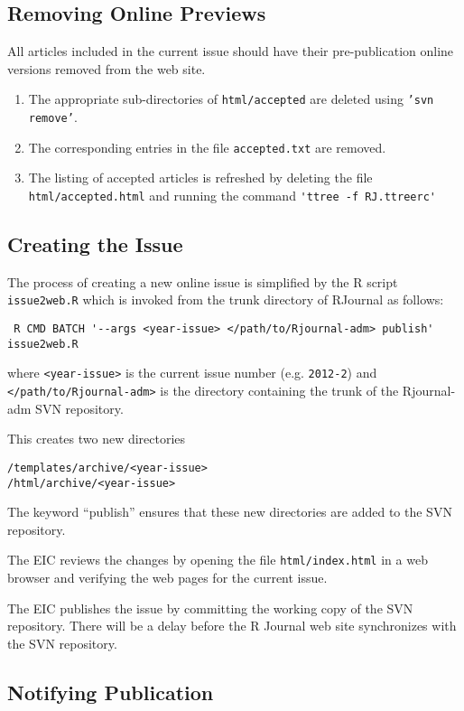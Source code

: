 \documentclass[11pt]{article}
\begin{document}
\subsection{Removing Online Previews}

All articles included in the current issue should have their 
pre-publication online versions removed from the web site. 
\begin{enumerate}
\item The appropriate sub-directories of \texttt{html/accepted} are
  deleted using \texttt{'svn remove'}.
\item The corresponding entries in the file \texttt{accepted.txt} are 
  removed.
\item The listing of accepted articles is refreshed by deleting the
  file \texttt{html/accepted.html} and running the command
  \verb+'ttree -f RJ.ttreerc'+
\end{enumerate}

\subsection{Creating the Issue}

The process of creating a new online issue is simplified by the
R script \texttt{issue2web.R} which is invoked from the trunk
directory of RJournal as follows:
{\small
\begin{verbatim}
 R CMD BATCH '--args <year-issue> </path/to/Rjournal-adm> publish' issue2web.R
\end{verbatim}
}
where \verb+<year-issue>+ is the current issue number
(e.g. \texttt{2012-2}) and \verb+</path/to/Rjournal-adm>+ is the
directory containing the trunk of the Rjournal-adm SVN repository. 

This creates two new directories
\begin{verbatim}
/templates/archive/<year-issue>
/html/archive/<year-issue>
\end{verbatim}
The keyword ``publish'' ensures that these new directories are
added to the SVN repository.

The EIC reviews the changes by opening the file
\texttt{html/index.html} in a web browser and verifying the web
pages for the current issue.

The EIC publishes the issue by committing the working copy of the SVN
repository. There will be a delay before the R Journal web site
synchronizes with the SVN repository.

\subsection{Notifying Publication}
\end{document}
